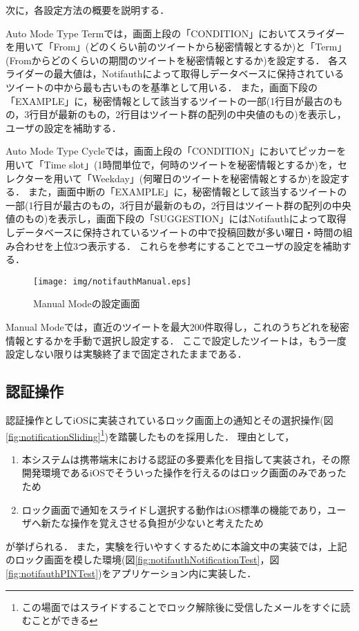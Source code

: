 次に，各設定方法の概要を説明する．

Auto Mode Type Termでは，画面上段の「CONDITION」においてスライダーを用いて「From」(どのくらい前のツイートから秘密情報とするか)と「Term」(Fromからどのくらいの期間のツイートを秘密情報とするか)を設定する．
各スライダーの最大値は，Notifauthによって取得しデータベースに保持されているツイートの中から最も古いものを基準として用いる．
また，画面下段の「EXAMPLE」に，秘密情報として該当するツイートの一部(1行目が最古のもの，3行目が最新のもの，2行目はツイート群の配列の中央値のもの)を表示し，ユーザの設定を補助する．

Auto Mode Type Cycleでは，画面上段の「CONDITION」においてピッカーを用いて「Time slot」(1時間単位で，何時のツイートを秘密情報とするか)を，セレクターを用いて「Weekday」(何曜日のツイートを秘密情報とするか)を設定する．
また，画面中断の「EXAMPLE」に，秘密情報として該当するツイートの一部(1行目が最古のもの，3行目が最新のもの，2行目はツイート群の配列の中央値のもの)を表示し，画面下段の「SUGGESTION」にはNotifauthによって取得しデータベースに保持されているツイートの中で投稿回数が多い曜日・時間の組み合わせを上位3つ表示する．
これらを参考にすることでユーザの設定を補助する．

\begin{figure}
  \begin{center}
    \texttt{[image: img/notifauthManual.eps]}
  \end{center}
  \caption{Manual Modeの設定画面}
  \label{fig:notifauthManual}
\end{figure}

Manual Modeでは，直近のツイートを最大200件取得し，これのうちどれを秘密情報とするかを手動で選択し設定する．
ここで設定したツイートは，もう一度設定しない限りは実験終了まで固定されたままである．

\subsection{認証操作}
認証操作としてiOSに実装されているロック画面上の通知とその選択操作(図\ref{fig:notificationSliding}\footnote{この場面ではスライドすることでロック解除後に受信したメールをすぐに読むことができる})を踏襲したものを採用した．
理由として，
\begin{enumerate}
  \item 本システムは携帯端末における認証の多要素化を目指して実装され，その際開発環境であるiOSでそういった操作を行えるのはロック画面のみであったため
  \item ロック画面で通知をスライドし選択する動作はiOS標準の機能であり，ユーザへ新たな操作を覚えさせる負担が少ないと考えたため
\end{enumerate}
が挙げられる．
また，実験を行いやすくするために本論文中の実装では，上記のロック画面を模した環境(図\ref{fig:notifauthNotificationTest}，図\ref{fig:notifauthPINTest})をアプリケーション内に実装した．

